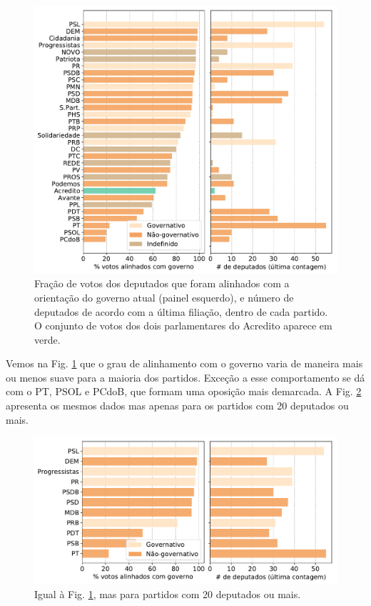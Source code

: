 \documentclass[12pt,a4paper]{article}
\begin{document}
\begin{figure}[H]
\centering
\includegraphics[width=1.0\textwidth]{graficos/apoio_ao_governo_partidos+tamanho_2019-05-03.pdf}
\caption{Fração de votos dos deputados que foram alinhados com a orientação do governo atual (painel esquerdo), e
  número de deputados de acordo com a última filiação, dentro de cada partido. O conjunto de votos dos dois
  parlamentares do Acredito aparece em verde.}
\label{fig:apoio-governo-partido}
\end{figure} 

Vemos na Fig. \ref{fig:apoio-governo-partido} que o grau de alinhamento com o governo varia de maneira
mais ou menos suave para a maioria dos partidos. Exceção a esse comportamento se dá com o PT, PSOL e
PCdoB, que formam uma oposição mais demarcada. A Fig. \ref{fig:apoio-governo-partido-G} apresenta os
mesmos dados mas apenas para os partidos com 20 deputados ou mais.

\begin{figure}[H]
\centering
\includegraphics[width=1.0\textwidth]{graficos/apoio_ao_governo_partidosG+tamanho_2019-05-03.pdf}
\caption{Igual à Fig. \ref{fig:apoio-governo-partido}, mas para partidos com 20 deputados ou mais.}
\label{fig:apoio-governo-partido-G}
\end{figure} 
\end{document}
